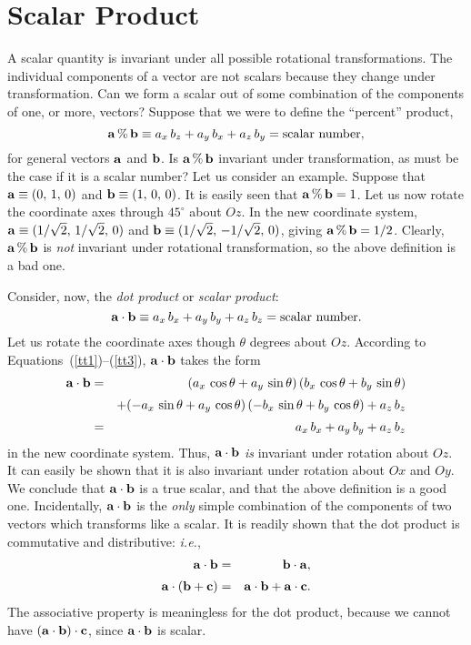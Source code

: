 \section{Scalar Product}\label{sscalar}
A scalar quantity is invariant under all possible rotational transformations.
The individual components of a vector are not scalars because they change under
transformation. Can we form a scalar out of some combination of the components
of one, or more, vectors? Suppose that we were to define the
``percent''  product,
\begin{equation}
{\bf a}\,\%\,{\bf b} \equiv a_x \,b_z + a_y \,b_x + a_z \,b_y = {\rm scalar~number},
\end{equation}
for general vectors ${\bf a}$ and ${\bf b}$. Is ${\bf a}\,\%\,{\bf b}$ 
invariant under transformation, as must be the case if it is a scalar number?
Let us consider an example. Suppose that ${\bf a} \equiv (0,\,1,\,0)$ and
${\bf b} \equiv (1,\,0,\,0)$. It is easily seen that ${\bf a}\,\%\,{\bf b}= 1$. Let
us now rotate the coordinate axes through $45^\circ$ about  $Oz$. In the new
coordinate system, ${\bf a} \equiv (1/\sqrt{2},\, 1/\sqrt{2},\, 0)$ and ${\bf b} \equiv (1/\sqrt{2},\,-
1/\sqrt{2},\, 0)$, giving ${\bf a}\,\%\,{\bf b} = 1/2$. Clearly, ${\bf a}\,\%\,{\bf b}$
is {\em not} invariant under rotational transformation, so 
the above definition is a bad one.

Consider, now, 
the {\em dot product}\/ or {\em scalar product}:
\begin{equation}
{\bf a} \cdot {\bf b} \equiv a_x \,b_x + a_y \,b_y + a_z \,b_z =  {\rm scalar~number}.
\end{equation}
Let us rotate the coordinate axes though $\theta$ degrees about $Oz$. According to
Equations~(\ref{tt1})--(\ref{tt3}),  ${\bf a} \cdot {\bf b}$ takes the form
\begin{eqnarray}
 {\bf a} \cdot {\bf b} &= &(a_x\, \cos\theta+a_y\,\sin\theta)\,(b_x\,\cos\theta + b_y\,\sin\theta)\nonumber\\[0.5ex]
&&+(-a_x\,\sin\theta + a_y\,\cos\theta)\,(-b_x\,\sin \theta + b_y\,\cos\theta)
+a_z\, b_z\nonumber\\[0.5ex]
&= &a_x\, b_x + a_y\, b_y + a_z\, b_z
\end{eqnarray}
in the new coordinate system.
Thus, 
${\bf a} \cdot {\bf b}$ {\em is}\/ invariant under rotation about $Oz$. It can easily
be shown that it is also invariant under rotation about $Ox$ and $Oy$.
We conclude that ${\bf a} \cdot {\bf b}$ is a true scalar, and that the above definition is
a good one. Incidentally, ${\bf a} \cdot {\bf b}$ is the {\em only}\/
simple  combination of
the components of two vectors which transforms like a scalar. It is readily 
shown that the dot product  is commutative  and distributive: {\em i.e.},
\begin{eqnarray}
{\bf a} \cdot {\bf b} &=& {\bf b} \cdot {\bf a},\nonumber\\[0.5ex] 
{\bf a}\cdot({\bf b}+{\bf c}) &=& {\bf a} \cdot {\bf b} + {\bf a}\cdot {\bf c}.
\end{eqnarray}
The associative property is meaningless for the dot product, because we cannot
have $({\bf a}\cdot{\bf b}) \cdot{\bf c}$, since  ${\bf a}\cdot{\bf b}$ is scalar.

